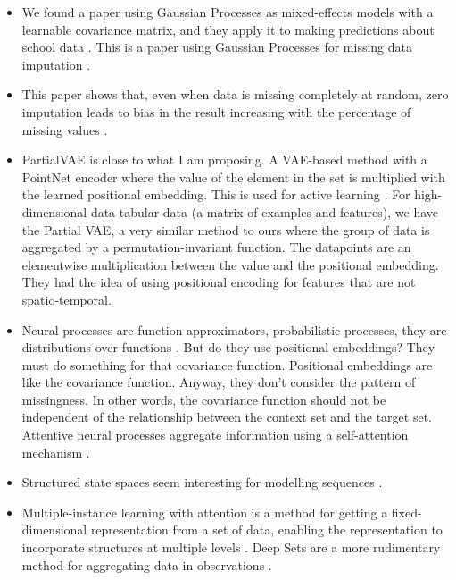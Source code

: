 \documentclass[a4paper,12pt,twoside,openright]{report}
\begin{document}
\begin{itemize}
    \item We found a paper using Gaussian Processes as mixed-effects models with a learnable covariance matrix, and they apply it to making predictions about school data \parencite{bonillaMultitaskGaussianProcess}. This is a paper using Gaussian Processes for missing data imputation \parencite{jafrastehGaussianProcessesMissing2022}.
    \item This paper shows that, even when data is missing completely at random, zero imputation leads to bias in the result increasing with the percentage of missing values \parencite{yiWhyNotUse2019}.
    \item PartialVAE is close to what I am proposing. A VAE-based method with a PointNet encoder where the value of the element in the set is multiplied with the learned positional embedding. This is used for active learning \parencite{maEDDIEfficientDynamic2019}. For high-dimensional data tabular data (a matrix of examples and features), we have the Partial VAE, a very similar method to ours where the group of data is aggregated by a permutation-invariant function. The datapoints are an elementwise multiplication between the value and the positional embedding. They had the idea of using positional encoding for features that are not spatio-temporal.
    \item Neural processes are function approximators, probabilistic processes, they are distributions over functions \parencite{garneloConditionalNeuralProcesses2018}. But do they use positional embeddings? They must do something for that covariance function. Positional embeddings are like the covariance function. Anyway, they don't consider the pattern of missingness. In other words, the covariance function should not be independent of the relationship between the context set and the target set. Attentive neural processes aggregate information using a self-attention mechanism \parencite{kimAttentiveNeuralProcesses2019}.
    \item Structured state spaces seem interesting for modelling sequences \parencite{guEfficientlyModelingLong2022}.
    \item Multiple-instance learning with attention is a method for getting a fixed-dimensional representation from a set of data, enabling the representation to incorporate structures at multiple levels \parencite{ilseAttentionbasedDeepMultiple2018}. Deep Sets are a more rudimentary method for aggregating data in observations \parencite{zaheerDeepSets2017}.
\end{itemize}
\end{document}
